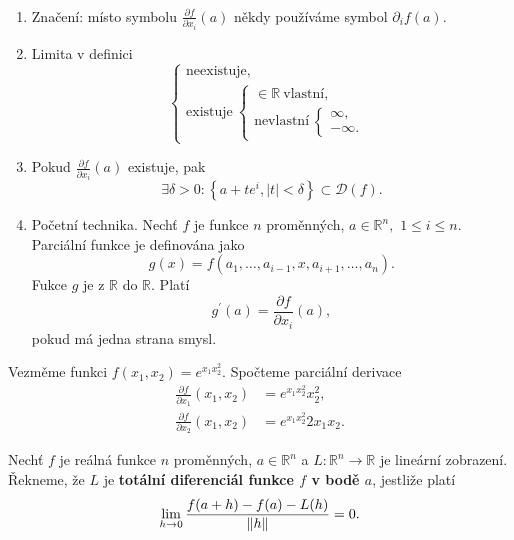 \begin{poznamka}\,
\begin{enumerate}[(1)]
	\item Značení: místo symbolu $\frac{\partial f }{\partial x_i}(a)$ někdy používáme symbol $\partial_i f(a)$.
	\item Limita v definici
	$$
 \begin{cases}
		\text{neexistuje},\\
		\text{existuje} \ \begin{cases}
			\in \mathbb R \ \text{vlastní},\\
			\text{nevlastní} \ \begin{cases}
				\infty,\\
				-\infty.
\end{cases}
\end{cases}
 \end{cases}
	$$
	\item Pokud $\frac{\partial f }{\partial x_i}(a)$ existuje, pak
	$$
	    \exists \delta>0: \left \{ a+te^i, |t|<\delta \right \}\subset \mathcal D(f).
	$$
	\item Početní technika. Nechť $f$ je funkce $n$ proměnných, $a \in \mathbb R ^n,$ $1\leq i \leq n$.
	Parciální funkce je definována jako
	$$
	g(x)=f(a_1,\dots,a_{i-1},x,a_{i+1},\dots,a_n).
	$$
	Fukce $g$ je z $\mathbb R $ do $\mathbb R $.
	Platí
    $$
    g^\prime(a)=\frac{\partial f }{\partial x_i}(a),
    $$
    pokud má jedna strana smysl.
\end{enumerate}
\end{poznamka}

\begin{priklad}
	Vezměme funkci $f(x_1,x_2)=e^{x_1x_2^2}$. Spočteme parciální derivace
	\begin{align*}
		\frac{\partial f }{\partial x_1} (x_1,x_2) &= e^{x_1x_2^2}x_2^2,\\
		\frac{\partial f }{\partial x_2} (x_1,x_2) &= e^{x_1x_2^2}2x_1x_2.
\end{align*}
\end{priklad}

\begin{definice}
Nechť $f$ je reálná funkce $n$ proměnných,
$a\in\mathbb{R}^n$
a $L:\mathbb{R}^n\to\mathbb{R}$ je lineární zobrazení.
Řekneme, že $L$ je \textbf{totální diferenciál funkce
$f$ v bodě $a$}, jestliže platí
\[
\lim_{h\to0}
\frac{
f(a+h)-f(a)-L(h)
}{
\lVert h \rVert
}
=
0.
\]
\end{definice}

